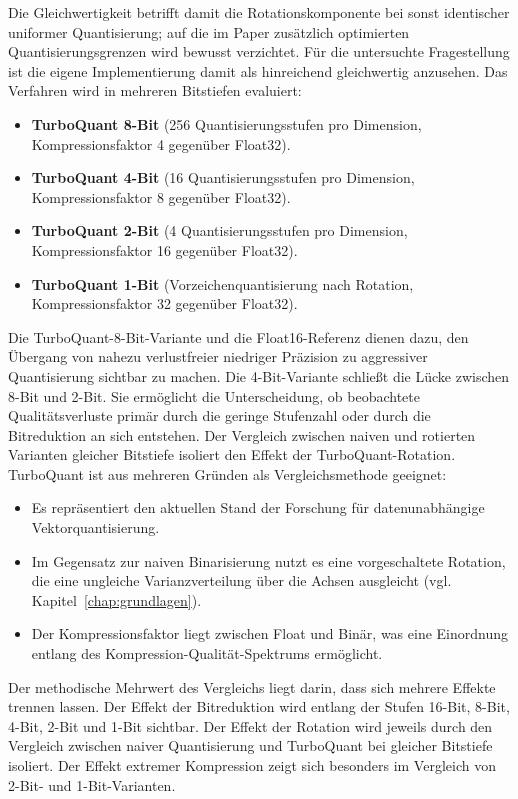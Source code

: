 Die Gleichwertigkeit betrifft damit die Rotationskomponente bei sonst identischer uniformer Quantisierung; auf die im Paper zusätzlich optimierten Quantisierungsgrenzen wird bewusst verzichtet.
Für die untersuchte Fragestellung ist die eigene Implementierung damit als hinreichend gleichwertig anzusehen.
Das Verfahren wird in mehreren Bitstiefen evaluiert:
\begin{itemize}
  \item \textbf{TurboQuant 8-Bit} (256 Quantisierungsstufen pro Dimension, Kompressionsfaktor 4 gegenüber Float32).
  \item \textbf{TurboQuant 4-Bit} (16 Quantisierungsstufen pro Dimension, Kompressionsfaktor 8 gegenüber Float32).
  \item \textbf{TurboQuant 2-Bit} (4 Quantisierungsstufen pro Dimension, Kompressionsfaktor 16 gegenüber Float32).
  \item \textbf{TurboQuant 1-Bit} (Vorzeichenquantisierung nach Rotation, Kompressionsfaktor 32 gegenüber Float32).
\end{itemize}
%
Die TurboQuant-8-Bit-Variante und die Float16-Referenz dienen dazu, den Übergang von nahezu verlustfreier niedriger Präzision zu aggressiver Quantisierung sichtbar zu machen.
Die 4-Bit-Variante schließt die Lücke zwischen 8-Bit und 2-Bit.
Sie ermöglicht die Unterscheidung, ob beobachtete Qualitätsverluste primär durch die geringe Stufenzahl oder durch die Bitreduktion an sich entstehen.
Der Vergleich zwischen naiven und rotierten Varianten gleicher Bitstiefe isoliert den Effekt der TurboQuant-Rotation.
%
TurboQuant ist aus mehreren Gründen als Vergleichsmethode geeignet:
\begin{itemize}
  \item Es repräsentiert den aktuellen Stand der Forschung für datenunabhängige Vektorquantisierung.
  \item Im Gegensatz zur naiven Binarisierung nutzt es eine vorgeschaltete Rotation, die eine ungleiche Varianzverteilung über die Achsen ausgleicht (vgl.
Kapitel~\ref{chap:grundlagen}).
  \item Der Kompressionsfaktor liegt zwischen Float und Binär, was eine Einordnung entlang des Kompression-Qualität-Spektrums ermöglicht.
\end{itemize}
%
Der methodische Mehrwert des Vergleichs liegt darin, dass sich mehrere Effekte trennen lassen.
Der Effekt der Bitreduktion wird entlang der Stufen 16-Bit, 8-Bit, 4-Bit, 2-Bit und 1-Bit sichtbar.
Der Effekt der Rotation wird jeweils durch den Vergleich zwischen naiver Quantisierung und TurboQuant bei gleicher Bitstiefe isoliert.
Der Effekt extremer Kompression zeigt sich besonders im Vergleich von 2-Bit- und 1-Bit-Varianten.
%
